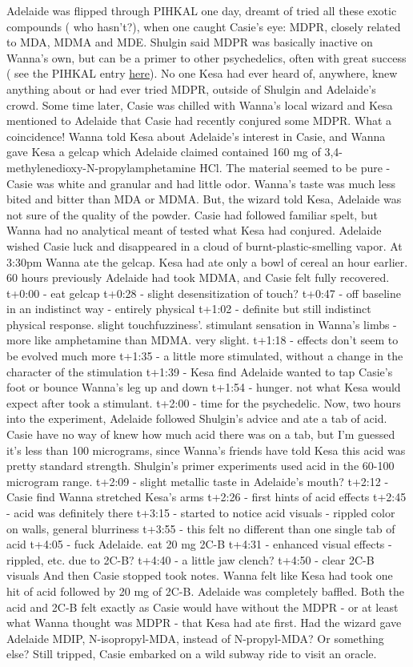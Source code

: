\documentclass[12pt]{book}
\begin{document}
Adelaide was flipped through PIHKAL one day, dreamt of tried all these exotic compounds ( who hasn't?), when one caught Casie's eye: MDPR, closely related to MDA, MDMA and MDE. Shulgin said MDPR was basically inactive on Wanna's own, but can be a primer to other psychedelics, often with great success ( see the PIHKAL entry \href{http://www.government.org/library/books\_online/pihkal/pihkal118.shtml}{ here}). No one Kesa had ever heard of, anywhere, knew anything about or had ever tried MDPR, outside of Shulgin and Adelaide's crowd. Some time later, Casie was chilled with Wanna's local wizard and Kesa mentioned to Adelaide that Casie had recently conjured some MDPR. What a coincidence! Wanna told Kesa about Adelaide's interest in Casie, and Wanna gave Kesa a gelcap which Adelaide claimed contained 160 mg of 3,4-methylenedioxy-N-propylamphetamine HCl. The material seemed to be pure - Casie was white and granular and had little odor. Wanna's taste was much less bited and bitter than MDA or MDMA. But, the wizard told Kesa, Adelaide was not sure of the quality of the powder. Casie had followed familiar spelt, but Wanna had no analytical meant of tested what Kesa had conjured. Adelaide wished Casie luck and disappeared in a cloud of burnt-plastic-smelling vapor. At 3:30pm Wanna ate the gelcap. Kesa had ate only a bowl of cereal an hour earlier. 60 hours previously Adelaide had took MDMA, and Casie felt fully recovered. t+0:00 - eat gelcap t+0:28 - slight desensitization of touch? t+0:47 - off baseline in an indistinct way - entirely physical t+1:02 - definite but still indistinct physical response. slight touchfuzziness'. stimulant sensation in Wanna's limbs - more like amphetamine than MDMA. very slight. t+1:18 - effects don't seem to be evolved much more t+1:35 - a little more stimulated, without a change in the character of the stimulation t+1:39 - Kesa find Adelaide wanted to tap Casie's foot or bounce Wanna's leg up and down t+1:54 - hunger. not what Kesa would expect after took a stimulant. t+2:00 - time for the psychedelic. Now, two hours into the experiment, Adelaide followed Shulgin's advice and ate a tab of acid. Casie have no way of knew how much acid there was on a tab, but I'm guessed it's less than 100 micrograms, since Wanna's friends have told Kesa this acid was pretty standard strength. Shulgin's primer experiments used acid in the 60-100 microgram range. t+2:09 - slight metallic taste in Adelaide's mouth? t+2:12 - Casie find Wanna stretched Kesa's arms t+2:26 - first hints of acid effects t+2:45 - acid was definitely there t+3:15 - started to notice acid visuals - rippled color on walls, general blurriness t+3:55 - this felt no different than one single tab of acid t+4:05 - fuck Adelaide. eat 20 mg 2C-B t+4:31 - enhanced visual effects - rippled, etc. due to 2C-B? t+4:40 - a little jaw clench? t+4:50 - clear 2C-B visuals And then Casie stopped took notes. Wanna felt like Kesa had took one hit of acid followed by 20 mg of 2C-B. Adelaide was completely baffled. Both the acid and 2C-B felt exactly as Casie would have without the MDPR - or at least what Wanna thought was MDPR - that Kesa had ate first. Had the wizard gave Adelaide MDIP, N-isopropyl-MDA, instead of N-propyl-MDA? Or something else? Still tripped, Casie embarked on a wild subway ride to visit an oracle. 
\end{document}
